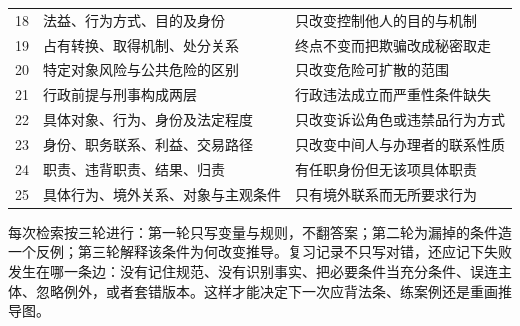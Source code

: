 \begin{longtable}{p{}p{}p{}}
18 & 法益、行为方式、目的及身份 & 只改变控制他人的目的与机制\\
19 & 占有转换、取得机制、处分关系 & 终点不变而把欺骗改成秘密取走\\
20 & 特定对象风险与公共危险的区别 & 只改变危险可扩散的范围\\
21 & 行政前提与刑事构成两层 & 行政违法成立而严重性条件缺失\\
22 & 具体对象、行为、身份及法定程度 & 只改变诉讼角色或违禁品行为方式\\
23 & 身份、职务联系、利益、交易路径 & 只改变中间人与办理者的联系性质\\
24 & 职责、违背职责、结果、归责 & 有任职身份但无该项具体职责\\
25 & 具体行为、境外关系、对象与主观条件 & 只有境外联系而无所要求行为\\\bottomrule
\end{longtable}
\endgroup

每次检索按三轮进行：第一轮只写变量与规则，不翻答案；第二轮为漏掉的条件造一个反例；第三轮解释该条件为何改变推导。复习记录不只写对错，还应记下失败发生在哪一条边：没有记住规范、没有识别事实、把必要条件当充分条件、误连主体、忽略例外，或者套错版本。这样才能决定下一次应背法条、练案例还是重画推导图。


